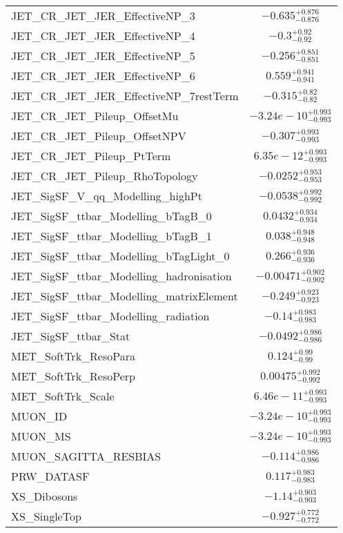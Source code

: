 \begin{tabular}{|l|c|}
JET\_CR\_JET\_JER\_EffectiveNP\_3 & $-0.635^{+0.876}_{-0.876}$ \\
JET\_CR\_JET\_JER\_EffectiveNP\_4 & $-0.3^{+0.92}_{-0.92}$ \\
JET\_CR\_JET\_JER\_EffectiveNP\_5 & $-0.256^{+0.851}_{-0.851}$ \\
JET\_CR\_JET\_JER\_EffectiveNP\_6 & $0.559^{+0.941}_{-0.941}$ \\
JET\_CR\_JET\_JER\_EffectiveNP\_7restTerm & $-0.315^{+0.82}_{-0.82}$ \\
JET\_CR\_JET\_Pileup\_OffsetMu & $-3.24e-10^{+0.993}_{-0.993}$ \\
JET\_CR\_JET\_Pileup\_OffsetNPV & $-0.307^{+0.993}_{-0.993}$ \\
JET\_CR\_JET\_Pileup\_PtTerm & $6.35e-12^{+0.993}_{-0.993}$ \\
JET\_CR\_JET\_Pileup\_RhoTopology & $-0.0252^{+0.953}_{-0.953}$ \\
JET\_SigSF\_V\_qq\_Modelling\_highPt & $-0.0538^{+0.992}_{-0.992}$ \\
JET\_SigSF\_ttbar\_Modelling\_bTagB\_0 & $0.0432^{+0.934}_{-0.934}$ \\
JET\_SigSF\_ttbar\_Modelling\_bTagB\_1 & $0.038^{+0.948}_{-0.948}$ \\
JET\_SigSF\_ttbar\_Modelling\_bTagLight\_0 & $0.266^{+0.936}_{-0.936}$ \\
JET\_SigSF\_ttbar\_Modelling\_hadronisation & $-0.00471^{+0.902}_{-0.902}$ \\
JET\_SigSF\_ttbar\_Modelling\_matrixElement & $-0.249^{+0.923}_{-0.923}$ \\
JET\_SigSF\_ttbar\_Modelling\_radiation & $-0.14^{+0.983}_{-0.983}$ \\
JET\_SigSF\_ttbar\_Stat & $-0.0492^{+0.986}_{-0.986}$ \\
MET\_SoftTrk\_ResoPara & $0.124^{+0.99}_{-0.99}$ \\
MET\_SoftTrk\_ResoPerp & $0.00475^{+0.992}_{-0.992}$ \\
MET\_SoftTrk\_Scale & $6.46e-11^{+0.993}_{-0.993}$ \\
MUON\_ID & $-3.24e-10^{+0.993}_{-0.993}$ \\
MUON\_MS & $-3.24e-10^{+0.993}_{-0.993}$ \\
MUON\_SAGITTA\_RESBIAS & $-0.114^{+0.986}_{-0.986}$ \\
PRW\_DATASF & $0.117^{+0.983}_{-0.983}$ \\
XS\_Dibosons & $-1.14^{+0.903}_{-0.903}$ \\
XS\_SingleTop & $-0.927^{+0.772}_{-0.772}$ \\

\end{tabular}
